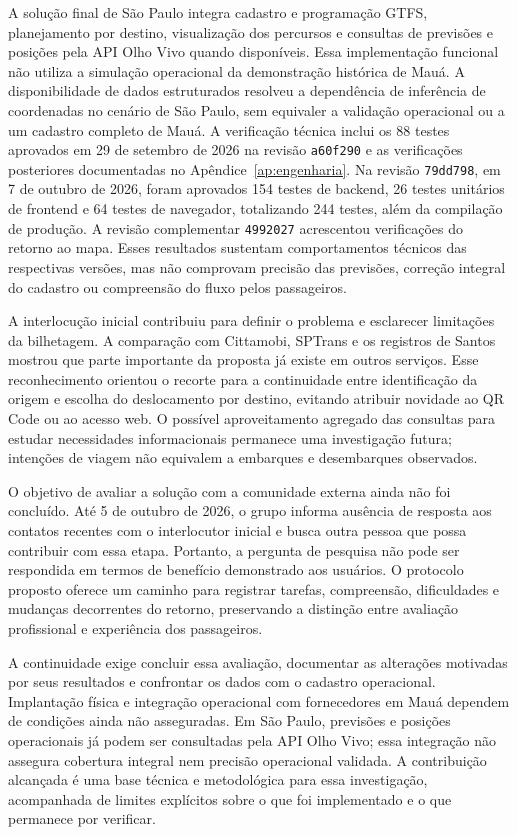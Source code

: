 \documentclass[12pt,oneside,a4paper,brazil,chapter=TITLE]{abntex2}
\begin{document}
A solução final de São Paulo integra cadastro e programação GTFS, planejamento por destino, visualização dos percursos e consultas de previsões e posições pela API Olho Vivo quando disponíveis. Essa implementação funcional não utiliza a simulação operacional da demonstração histórica de Mauá. A disponibilidade de dados estruturados resolveu a dependência de inferência de coordenadas no cenário de São Paulo, sem equivaler a validação operacional ou a um cadastro completo de Mauá. A verificação técnica inclui os 88 testes aprovados em 29 de setembro de 2026 na revisão \texttt{a60f290} e as verificações posteriores documentadas no Apêndice~\ref{ap:engenharia}. Na revisão \texttt{79dd798}, em 7 de outubro de 2026, foram aprovados 154 testes de backend, 26 testes unitários de frontend e 64 testes de navegador, totalizando 244 testes, além da compilação de produção. A revisão complementar \texttt{4992027} acrescentou verificações do retorno ao mapa. Esses resultados sustentam comportamentos técnicos das respectivas versões, mas não comprovam precisão das previsões, correção integral do cadastro ou compreensão do fluxo pelos passageiros.

A interlocução inicial contribuiu para definir o problema e esclarecer limitações da bilhetagem. A comparação com Cittamobi, SPTrans e os registros de Santos mostrou que parte importante da proposta já existe em outros serviços. Esse reconhecimento orientou o recorte para a continuidade entre identificação da origem e escolha do deslocamento por destino, evitando atribuir novidade ao QR Code ou ao acesso web. O possível aproveitamento agregado das consultas para estudar necessidades informacionais permanece uma investigação futura; intenções de viagem não equivalem a embarques e desembarques observados.

O objetivo de avaliar a solução com a comunidade externa ainda não foi concluído. Até 5 de outubro de 2026, o grupo informa ausência de resposta aos contatos recentes com o interlocutor inicial e busca outra pessoa que possa contribuir com essa etapa. Portanto, a pergunta de pesquisa não pode ser respondida em termos de benefício demonstrado aos usuários. O protocolo proposto oferece um caminho para registrar tarefas, compreensão, dificuldades e mudanças decorrentes do retorno, preservando a distinção entre avaliação profissional e experiência dos passageiros.

A continuidade exige concluir essa avaliação, documentar as alterações motivadas por seus resultados e confrontar os dados com o cadastro operacional. Implantação física e integração operacional com fornecedores em Mauá dependem de condições ainda não asseguradas. Em São Paulo, previsões e posições operacionais já podem ser consultadas pela API Olho Vivo; essa integração não assegura cobertura integral nem precisão operacional validada. A contribuição alcançada é uma base técnica e metodológica para essa investigação, acompanhada de limites explícitos sobre o que foi implementado e o que permanece por verificar.
\end{document}
